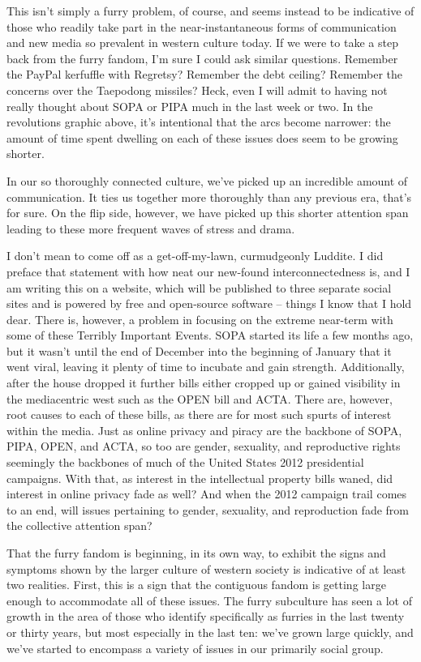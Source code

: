 This isn't simply a furry problem, of course, and seems instead to be indicative of those who readily take part in the near-instantaneous forms of communication and new media so prevalent in western culture today.  If we were to take a step back from the furry fandom, I'm sure I could ask similar questions.  Remember the PayPal kerfuffle with Regretsy?  Remember the debt ceiling?  Remember the concerns over the Taepodong missiles?  Heck, even I will admit to having not really thought about SOPA or PIPA much in the last week or two.  In the revolutions graphic above, it's intentional that the arcs become narrower: the amount of time spent dwelling on each of these issues does seem to be growing shorter.

In our so thoroughly connected culture, we've picked up an incredible amount of communication.  It ties us together more thoroughly than any previous era, that's for sure.  On the flip side, however, we have picked up this shorter attention span leading to these more frequent waves of stress and drama.

I don't mean to come off as a get-off-my-lawn, curmudgeonly Luddite.  I did preface that statement with how neat our new-found interconnectedness is, and I am writing this on a website, which will be published to three separate social sites and is powered by free and open-source software -- things I know that I hold dear.  There is, however, a problem in focusing on the extreme near-term with some of these Terribly Important Events.  SOPA started its life a few months ago, but it wasn't until the end of December into the beginning of January that it went viral, leaving it plenty of time to incubate and gain strength.  Additionally, after the house dropped it further bills either cropped up or gained visibility in the mediacentric west such as the OPEN bill and ACTA.  There are, however, root causes to each of these bills, as there are for most such spurts of interest within the media.  Just as online privacy and piracy are the backbone of SOPA, PIPA, OPEN, and ACTA, so too are gender, sexuality, and reproductive rights seemingly the backbones of much of the United States 2012 presidential campaigns.  With that, as interest in the intellectual property bills waned, did interest in online privacy fade as well?  And when the 2012 campaign trail comes to an end, will issues pertaining to gender, sexuality, and reproduction fade from the collective attention span?

That the furry fandom is beginning, in its own way, to exhibit the signs and symptoms shown by the larger culture of western society is indicative of at least two realities.  First, this is a sign that the contiguous fandom is getting large enough to accommodate all of these issues.  The furry subculture has seen a lot of growth in the area of those who identify specifically as furries in the last twenty or thirty years, but most especially in the last ten: we've grown large quickly, and we've started to encompass a variety of issues in our primarily social group.

